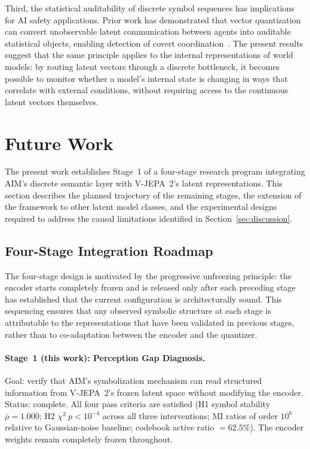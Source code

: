 \documentclass{article}
\begin{document}
Third, the statistical auditability of discrete symbol sequences has
implications for AI safety applications.
Prior work has demonstrated that vector quantization can convert
unobservable latent communication between agents into auditable
statistical objects, enabling detection of covert
coordination~\cite{liu2026drcb}.
The present results suggest that the same principle applies to the
internal representations of world models: by routing latent vectors
through a discrete bottleneck, it becomes possible to monitor whether
a model's internal state is changing in ways that correlate with
external conditions, without requiring access to the continuous latent
vectors themselves.


\section{Future Work}
\label{sec:future}

The present work establishes Stage~1 of a four-stage research program
integrating AIM's discrete semantic layer with V-JEPA~2's latent
representations.
This section describes the planned trajectory of the remaining stages,
the extension of the framework to other latent model classes, and the
experimental designs required to address the causal limitations
identified in Section~\ref{sec:discussion}.

\subsection{Four-Stage Integration Roadmap}

The four-stage design is motivated by the progressive unfreezing
principle: the encoder starts completely frozen and is released only
after each preceding stage has established that the current
configuration is architecturally sound.
This sequencing ensures that any observed symbolic structure at each
stage is attributable to the representations that have been validated
in previous stages, rather than to co-adaptation between the encoder
and the quantizer.

\paragraph{Stage~1 (this work): Perception Gap Diagnosis.}
Goal: verify that AIM's symbolization mechanism can read structured
information from V-JEPA~2's frozen latent space without modifying the
encoder.
Status: complete.
All four pass criteria are satisfied
(H1 symbol stability $\bar{\rho} = 1.000$;
H2 $\chi^2\ p < 10^{-4}$ across all three interventions;
MI ratios of order $10^6$ relative to Gaussian-noise baseline;
codebook active ratio $= 62.5\%$).
The encoder weights remain completely frozen throughout.
\end{document}
